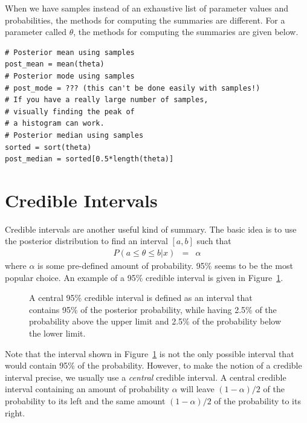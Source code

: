 When we have samples instead of an exhaustive list of parameter values and
probabilities, the methods for computing the summaries are different. For a
parameter called $\theta$, the methods for computing the summaries are given
below.

\begin{framed}
\begin{verbatim}
# Posterior mean using samples
post_mean = mean(theta)
# Posterior mode using samples
# post_mode = ??? (this can't be done easily with samples!)
# If you have a really large number of samples,
# visually finding the peak of
# a histogram can work.
# Posterior median using samples
sorted = sort(theta)
post_median = sorted[0.5*length(theta)]
\end{verbatim}
\end{framed}

\section{Credible Intervals}
Credible intervals are another useful kind of summary. The basic idea is to
use the posterior distribution to find an interval $[a, b]$ such that
\begin{eqnarray}
P(a \leq \theta \leq b | x) &=& \alpha
\end{eqnarray}
where $\alpha$ is some pre-defined amount of probability. 95\% seems to be the
most popular choice. An example of a 95\% credible interval is given in
Figure~\ref{fig:credible_interval}.

\begin{figure}
\begin{center}

\caption{A central 95\% credible interval is defined as an interval that
contains 95\% of the posterior probability, while having 2.5\% of the probability
above the upper limit and 2.5\% of the probability below the lower limit.
\label{fig:credible_interval}}
\end{center}
\end{figure}

Note that the interval shown in Figure~\ref{fig:credible_interval} is not the
only possible interval that would contain 95\% of the probability. However, to
make the notion of a credible interval precise, we usually use a {\it central}
credible interval. A central credible interval containing an amount of probability
$\alpha$ will leave $(1-\alpha)/2$ of the probability to its left and
the same amount $(1-\alpha)/2$ of the probability to its right.

